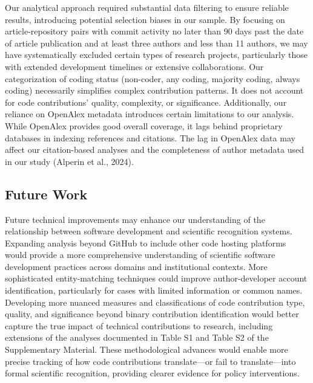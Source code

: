 \documentclass[
  number,
  3p,
  onecolumn]{elsarticle}
\begin{document}
Our analytical approach required substantial data filtering to ensure
reliable results, introducing potential selection biases in our sample.
By focusing on article-repository pairs with commit activity no later
than 90 days past the date of article publication and at least three
authors and less than 11 authors, we may have systematically excluded
certain types of research projects, particularly those with extended
development timelines or extensive collaborations. Our categorization of
coding status (non-coder, any coding, majority coding, always coding)
necessarily simplifies complex contribution patterns. It does not
account for code contributions' quality, complexity, or significance.
Additionally, our reliance on OpenAlex metadata introduces certain
limitations to our analysis. While OpenAlex provides good overall
coverage, it lags behind proprietary databases in indexing references
and citations. The lag in OpenAlex data may affect our citation-based
analyses and the completeness of author metadata used in our study
(Alperin et al., 2024).

\subsection{Future Work}\label{future-work}

Future technical improvements may enhance our understanding of the
relationship between software development and scientific recognition
systems. Expanding analysis beyond GitHub to include other code hosting
platforms would provide a more comprehensive understanding of scientific
software development practices across domains and institutional
contexts. More sophisticated entity-matching techniques could improve
author-developer account identification, particularly for cases with
limited information or common names. Developing more nuanced measures
and classifications of code contribution type, quality, and significance
beyond binary contribution identification would better capture the true
impact of technical contributions to research, including extensions of
the analyses documented in Table S1 and Table S2 of the Supplementary
Material. These methodological advances would enable more precise
tracking of how code contributions translate---or fail to
translate---into formal scientific recognition, providing clearer
evidence for policy interventions.
\end{document}
